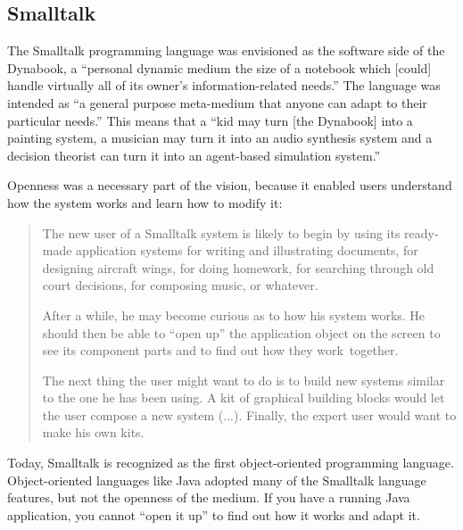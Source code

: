 \subsection{Smalltalk}
The Smalltalk programming language was envisioned as the software side of the Dynabook,
a ``personal dynamic medium the size of a notebook which [could] handle
virtually all of its owner's information-related needs.'' The language
was intended as ``a general purpose meta-medium that anyone can adapt to their particular
needs.'' This means that a ``kid may turn [the Dynabook] into a painting system, a musician may turn it
into an audio synthesis system and a decision theorist can turn it into an agent-based simulation
system.''

Openness was a necessary part of the vision, because it enabled users understand how the system
works and learn how to modify it:

\begin{quote}
The new user of a Smalltalk system is likely to begin by using its ready-made application
systems for writing and illustrating documents, for designing aircraft wings, for doing homework,
for searching through old court decisions, for composing music, or whatever.

After a while, he
may become curious as to how his system works. He should then be able to ``open up'' the
application object on the screen to see its component parts and to find out how they work~together.

The next thing the user might want to do is to build new systems similar to the one he has been
using. A kit of graphical building blocks would let the user compose a new system (...).
Finally, the expert user would want to make his own kits.
\end{quote}

Today, Smalltalk is recognized as the first object-oriented programming language.
Object-oriented languages like Java adopted many of the Smalltalk language features,
but not the openness of the medium. If you have a running Java
application, you cannot ``open it up'' to find out how it works and adapt
it.


